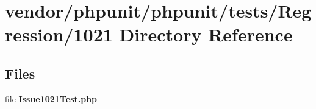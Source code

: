 \section{vendor/phpunit/phpunit/tests/\+Regression/1021 Directory Reference}
\label{dir_2a72c12914ed3951d868cefa27e777b6}
\subsection*{Files}
\begin{DoxyCompactItemize}
\item 
file {\bf Issue1021\+Test.\+php}
\end{DoxyCompactItemize}
